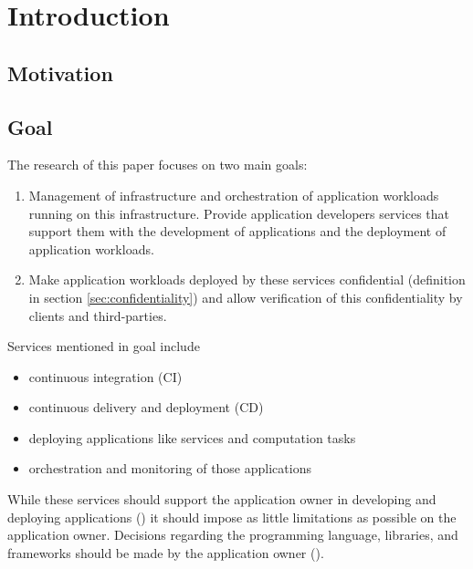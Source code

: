 
\chapter{Introduction}
\label{ch:Introduction}

\section{Motivation}
\label{sec:motivation}

\section{Goal}
\label{sec:goal}

The research of this paper focuses on two main goals:

\begin{enumerate}[label=\textbf{\Roman*}]
  \item Management of infrastructure and orchestration of application workloads
  running on this infrastructure. Provide application developers services that
  support them with the development of applications and the deployment of
  application workloads.
  \item Make application workloads deployed by these services confidential
  (definition in section \ref{sec:confidentiality}) and allow verification of
  this confidentiality by clients and third-parties.
\end{enumerate}

Services mentioned in goal  include
\begin{itemize}
  \item continuous integration (CI)
  \item continuous delivery and deployment (CD)
  \item deploying applications like services and computation tasks
  \item orchestration and monitoring of those applications
\end{itemize}
While these services should support the application owner in developing and
deploying applications () it should impose as little
limitations as possible on the application owner. Decisions regarding the
programming language, libraries, and frameworks should be made by the
application owner ().

